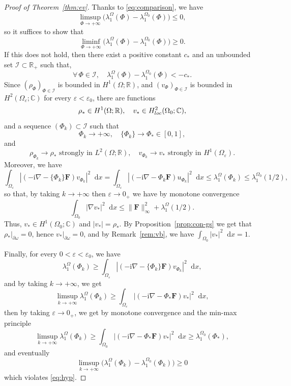 \documentclass[11pt]{amsart}
\newcommand{\R}{\mathbb R}
\newcommand{\C}{\mathbb C}
\newcommand{\Fb}{\mathbf F}
\newcommand{\dd}{\mathop{}\!{\mathrm d}}
\newcommand{\ii}{\mathrm i}
\newcommand{\cI}{\mathcal I}
\theoremstyle{definition}
\numberwithin{equation}{section}
\begin{document}
\begin{proof}[Proof of Theorem~\ref{thm:ev}]
Thanks to \eqref{eq:comparison}, we have
\[ \limsup_{\Phi\to+\infty} \bigl(\lambda_1^\Omega(\Phi)-\lambda_1^{\Omega_0}(\Phi)\bigr)\leq 0,\]
so it suffices to show that
\[ \liminf_{\Phi\to+\infty} \bigl(\lambda_1^\Omega(\Phi)-\lambda_1^{\Omega_0}(\Phi)\bigr)\geq 0.\]
If this does not hold, then there exist a positive constant $c_*$ and an unbounded set $\cI\subset\R_+$ such that,
\begin{equation}\label{eq:hyp}
\forall\, \Phi\in \cI, \quad \lambda_1^\Omega(\Phi)-\lambda_1^{\Omega_0}(\Phi)<-c_*.
\end{equation}
Since $(\rho_\Phi)_{\Phi\in \cI}$ is bounded in $H^1(\Omega;\R)$, and $(v_\Phi)_{\Phi\in\cI}$ is bounded in $H^2(\Omega_\varepsilon;\C)$ for every $\varepsilon<\varepsilon_0$, there are functions
\[\rho_*\in H^1(\Omega;\R),\quad v_*\in H^2_{\rm loc}(\Omega_0;\C),\]
and a sequence $(\Phi_k)\subset\cI$ such that
\[ \Phi_k\to+\infty,\quad \{\Phi_k\}\to \Phi_*\in[0,1],\]
and
\[\rho_{\Phi_k}\to\rho_*\text{ strongly in }L^2(\Omega;\R),\quad v_{\Phi_k}\to v_*\text{ strongly in }H^1(\Omega_\varepsilon).\]
%
Moreover,  we have
%
\[ \int_{\Omega_\varepsilon}|(-\ii\nabla-\{\Phi_k\}\Fb)v_{\Phi_k}|^2\dd x=\int_{\Omega_\varepsilon}|(-\ii\nabla-\Phi_k\Fb)u_{\Phi_k}|^2\dd x\leq \lambda_1^\Omega(\Phi_k)\leq \lambda_1^{\Omega_0}(1/2),\]
so that, by taking $k\to+\infty$ then $\varepsilon\to0_+$ we have by monotone convergence
\[ \int_{\Omega_0}|\nabla v_*|^2\dd x\leq \|\Fb\|_\infty^2+ \lambda_1^\Omega(1/2).\]
Thus, $v_*\in H^1(\Omega_0;\C)$ and $|v_*|=\rho_*$. By Proposition~\ref{prop:con-gs} we get that $\rho_*|_{\partial\omega}=0$, hence $v_*|_{\partial\omega}=0$, and  by Remark~\ref{rem:vb}, we have
$\int_{\Omega_0}|v_*|^2\dd x=1$.

Finally, for every $0<\varepsilon<\varepsilon_0$, we have
\[\lambda_1^{\Omega}(\Phi_k)\geq  \int_{\Omega_\varepsilon}|(-\ii\nabla-\{\Phi_k\}\Fb)v_{\Phi_k}|^2\dd x,\]
and by taking $k\to+\infty$, we get 
\[\limsup_{k\to+\infty}\lambda_1^{\Omega}(\Phi_k)\geq
\int_{\Omega_\varepsilon}|(-\ii\nabla-\Phi_*\Fb)v_{*}|^2\dd x,\]
then by taking $\varepsilon\to0_+$, we get by monotone convergence and the min-max principle
\[\limsup_{k\to+\infty}\lambda_1^{\Omega}(\Phi_k)\geq
\int_{\Omega_0}|(-\ii\nabla-\Phi_*\Fb)v_{*}|^2\dd x\geq \lambda_1^{\Omega_0}(\Phi_*),\]
and eventually
\[ \limsup_{k\to+\infty}\bigl(\lambda_1^{\Omega}(\Phi_k)-\lambda_1^{\Omega_0}(\Phi_k)\bigr)\geq 0\]
which violates \eqref{eq:hyp}.
\end{proof}
\end{document}
